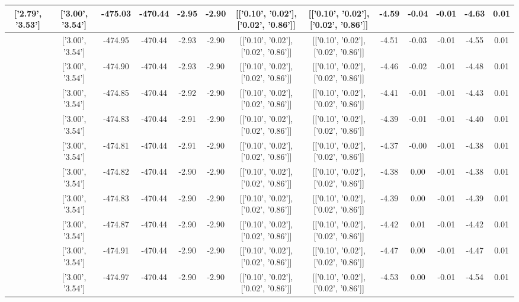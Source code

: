 \begin{table}[htbp]
\begin{adjustbox}{angle=90}
\begin{tabular}{|c|c|c|c|c|c|c|c|c|c|c|c|c|}
 ['2.79', '3.53'] & ['3.00', '3.54'] & -475.03 & -470.44 & -2.95 & -2.90 & [['0.10', '0.02'], ['0.02', '0.86']] & [['0.10', '0.02'], ['0.02', '0.86']] & -4.59 & -0.04 & -0.01 & -4.63 & 0.01\\ \hline
 ['2.83', '3.53'] & ['3.00', '3.54'] & -474.95 & -470.44 & -2.93 & -2.90 & [['0.10', '0.02'], ['0.02', '0.86']] & [['0.10', '0.02'], ['0.02', '0.86']] & -4.51 & -0.03 & -0.01 & -4.55 & 0.01\\ \hline
 ['2.87', '3.53'] & ['3.00', '3.54'] & -474.90 & -470.44 & -2.93 & -2.90 & [['0.10', '0.02'], ['0.02', '0.86']] & [['0.10', '0.02'], ['0.02', '0.86']] & -4.46 & -0.02 & -0.01 & -4.48 & 0.01\\ \hline
 ['2.91', '3.53'] & ['3.00', '3.54'] & -474.85 & -470.44 & -2.92 & -2.90 & [['0.10', '0.02'], ['0.02', '0.86']] & [['0.10', '0.02'], ['0.02', '0.86']] & -4.41 & -0.01 & -0.01 & -4.43 & 0.01\\ \hline
 ['2.94', '3.54'] & ['3.00', '3.54'] & -474.83 & -470.44 & -2.91 & -2.90 & [['0.10', '0.02'], ['0.02', '0.86']] & [['0.10', '0.02'], ['0.02', '0.86']] & -4.39 & -0.01 & -0.01 & -4.40 & 0.01\\ \hline
 ['2.98', '3.54'] & ['3.00', '3.54'] & -474.81 & -470.44 & -2.91 & -2.90 & [['0.10', '0.02'], ['0.02', '0.86']] & [['0.10', '0.02'], ['0.02', '0.86']] & -4.37 & -0.00 & -0.01 & -4.38 & 0.01\\ \hline
 ['3.02', '3.54'] & ['3.00', '3.54'] & -474.82 & -470.44 & -2.90 & -2.90 & [['0.10', '0.02'], ['0.02', '0.86']] & [['0.10', '0.02'], ['0.02', '0.86']] & -4.38 & 0.00 & -0.01 & -4.38 & 0.01\\ \hline
 ['3.06', '3.54'] & ['3.00', '3.54'] & -474.83 & -470.44 & -2.90 & -2.90 & [['0.10', '0.02'], ['0.02', '0.86']] & [['0.10', '0.02'], ['0.02', '0.86']] & -4.39 & 0.00 & -0.01 & -4.39 & 0.01\\ \hline
 ['3.10', '3.55'] & ['3.00', '3.54'] & -474.87 & -470.44 & -2.90 & -2.90 & [['0.10', '0.02'], ['0.02', '0.86']] & [['0.10', '0.02'], ['0.02', '0.86']] & -4.42 & 0.01 & -0.01 & -4.42 & 0.01\\ \hline
 ['3.13', '3.55'] & ['3.00', '3.54'] & -474.91 & -470.44 & -2.90 & -2.90 & [['0.10', '0.02'], ['0.02', '0.86']] & [['0.10', '0.02'], ['0.02', '0.86']] & -4.47 & 0.00 & -0.01 & -4.47 & 0.01\\ \hline
 ['3.17', '3.55'] & ['3.00', '3.54'] & -474.97 & -470.44 & -2.90 & -2.90 & [['0.10', '0.02'], ['0.02', '0.86']] & [['0.10', '0.02'], ['0.02', '0.86']] & -4.53 & 0.00 & -0.01 & -4.54 & 0.01\\ \hline

\end{tabular}
\end{adjustbox}
\end{table}
